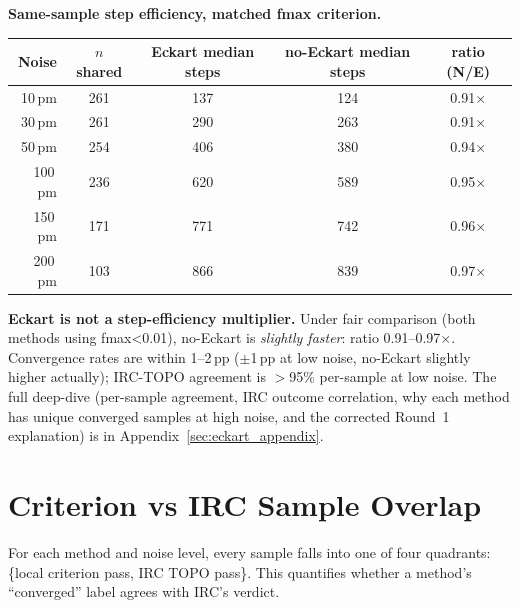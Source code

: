 \documentclass[11pt]{article}
\begin{document}
\begin{center}
\textbf{Same-sample step efficiency, matched fmax criterion.} \\[0.3em]
\begin{tabular}{rcccc}
\toprule
Noise & $n$ shared & Eckart median steps & no-Eckart median steps & ratio (N/E) \\
\midrule
10\,pm  & 261 & 137 & 124 & 0.91$\times$ \\
30\,pm  & 261 & 290 & 263 & 0.91$\times$ \\
50\,pm  & 254 & 406 & 380 & 0.94$\times$ \\
100\,pm & 236 & 620 & 589 & 0.95$\times$ \\
150\,pm & 171 & 771 & 742 & 0.96$\times$ \\
200\,pm & 103 & 866 & 839 & 0.97$\times$ \\
\bottomrule
\end{tabular}
\end{center}

\textbf{Eckart is not a step-efficiency multiplier.} Under fair
comparison (both methods using fmax<0.01), no-Eckart is \emph{slightly
faster}: ratio 0.91--0.97$\times$. Convergence rates are within 1--2\,pp
($\pm$1\,pp at low noise, no-Eckart slightly higher actually); IRC-TOPO
agreement is $>$95\% per-sample at low noise. The full deep-dive
(per-sample agreement, IRC outcome correlation, why each method has
unique converged samples at high noise, and the corrected Round~1
explanation) is in Appendix~\ref{sec:eckart_appendix}.

\newpage
\clearpage
\section{Criterion vs IRC Sample Overlap}

For each method and noise level, every sample falls into one of four
quadrants: \{local criterion pass, IRC TOPO pass\}. This quantifies whether
a method's ``converged'' label agrees with IRC's verdict.
\end{document}
